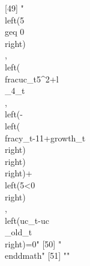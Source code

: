  [49] "\\left(5\\geq 0\\right)\\, \\left(\\frac{{uc_{t}}}{5^{2}}+{{l\\_4}_{t}}\\, \\left(-\\left(\\frac{{y_{t-1}}}{1+{growth_{t}}}\\right)\\right)\\right)+\\left(5<0\\right)\\, \\left({uc_{t}}-{{uc\\_old}_{t}}\\right)=0"                                                                                                                                                                                                                                                                                                                                                                                                                         
 [50] "\\end{dmath}"                                                                                                                                                                                                                                                                                                                                                                                                                                                                                                                                                                                                                                 
 [51] ""                                                                                                                                                                                                                                                                                                                                                                                                                                                                                                                                                                                                                                             
